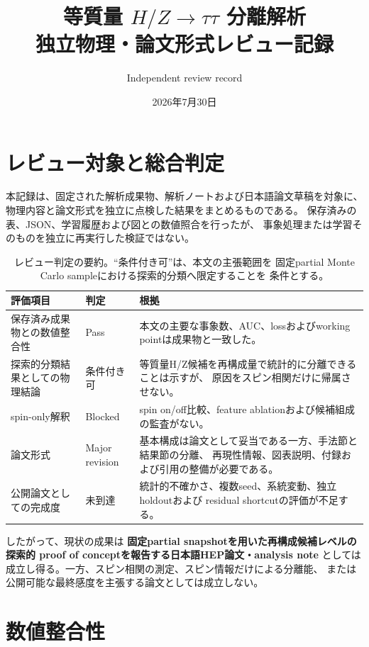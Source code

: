 \documentclass[xelatex,ja=standard,a4paper,10pt]{bxjsarticle}
\title{等質量 \(H/Z\rightarrow\tau\tau\) 分離解析\\
\large 独立物理・論文形式レビュー記録}
\author{Independent review record}
\date{2026年7月30日}
\begin{document}
\maketitle

\section{レビュー対象と総合判定}

本記録は、固定された解析成果物、解析ノートおよび日本語論文草稿を対象に、
物理内容と論文形式を独立に点検した結果をまとめるものである。
保存済みの表、JSON、学習履歴および図との数値照合を行ったが、
事象処理または学習そのものを独立に再実行した検証ではない。

\begin{table}[H]
  \centering
  \caption{レビュー判定の要約。``条件付き可''は、本文の主張範囲を
    固定partial Monte Carlo sampleにおける探索的分類へ限定することを
    条件とする。}
  \label{tab:review_summary}
  \begin{tabularx}{0.92\textwidth}{@{}p{}
    p{}X@{}}
    \toprule
    評価項目 & 判定 & 根拠 \\
    \midrule
    保存済み成果物との数値整合性 & Pass &
      本文の主要な事象数、AUC、lossおよびworking pointは成果物と一致した。\\
    探索的分類結果としての物理結論 & 条件付き可 &
      等質量H/Z候補を再構成量で統計的に分離できることは示すが、
      原因をスピン相関だけに帰属させない。\\
    spin-only解釈 & Blocked &
      spin on/off比較、feature ablationおよび候補組成の監査がない。\\
    論文形式 & Major revision &
      基本構成は論文として妥当である一方、手法節と結果節の分離、
      再現性情報、図表説明、付録および引用の整備が必要である。\\
    公開論文としての完成度 & 未到達 &
      統計的不確かさ、複数seed、系統変動、独立holdoutおよび
      residual shortcutの評価が不足する。\\
    \bottomrule
  \end{tabularx}
\end{table}

したがって、現状の成果は
\textbf{固定partial snapshotを用いた再構成候補レベルの探索的
proof of conceptを報告する日本語HEP論文・analysis note}
としては成立し得る。一方、スピン相関の測定、スピン情報だけによる分離能、
または公開可能な最終感度を主張する論文としては成立しない。

\section{数値整合性}
\end{document}
